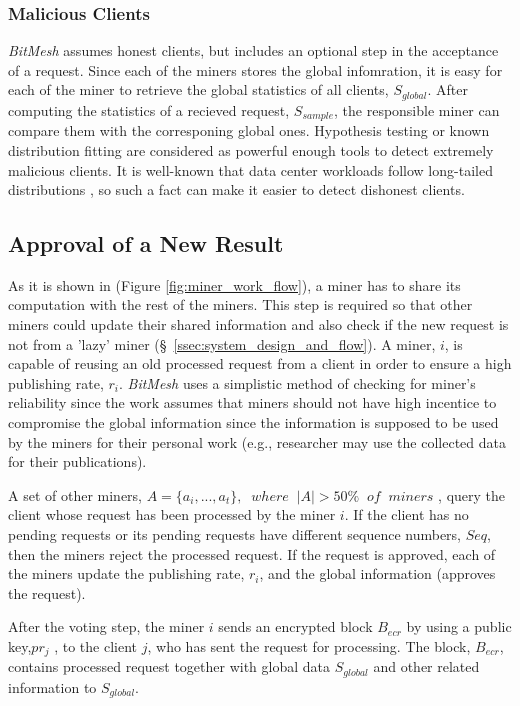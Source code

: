 \documentclass[11px]{article}
\newcommand{\projTitle}{BitMesh\xspace}
\begin{document}
\subsubsection{Malicious Clients} \label{sssec:malicious_client}
\textit{\projTitle} assumes honest clients, but includes an optional step in the acceptance of a request. Since each of the miners stores the global infomration, it is easy for each of the miner to retrieve the global statistics of all clients, $S_{global}$. After computing the statistics of a recieved request, $S_{sample}$, the responsible miner can compare them with the corresponing global ones. Hypothesis testing or known distribution fitting \cite{walpole_statistics} are considered as powerful enough tools to detect extremely malicious clients. It is well-known that data center workloads follow long-tailed distributions \cite{diurnal_pattern_data_center_2, dctcp_ref, pFabric_ref}, so such a fact can make it easier to detect dishonest clients.

\subsection{Approval of a New Result}
As it is shown in (Figure \ref{fig:miner_work_flow}), a miner has to share its computation with the rest of the miners.  This step is required so that other miners could update their shared information and also check if the new request is not from a 'lazy' miner (\S\ \ref{ssec:system_design_and_flow}). A miner, $i$, is capable of  reusing an old processed request from a client in order to ensure a high publishing rate, $r_i$. \textit{\projTitle} uses a simplistic method of checking for miner's reliability since the work assumes that miners should not have high incentice to compromise the global information since the information is supposed to be used by the miners for their personal work (e.g., researcher may use the collected data for their publications).

\noindent \newline A set of other miners, $A= \{a_i, ..., a_t\}, \; \; where \; \; |A| > 50\% \; \; of \; \; miners$ , query the client whose request has been processed by the miner $i$. If the client has no pending requests or its pending requests have different sequence numbers, $Seq$, then the miners reject the processed request. If the request is approved, each of the miners update the publishing rate, $r_i$, and the global information (approves the request).

\noindent \newline After the voting step, the miner $i$ sends an encrypted block $B_{ecr}$ by using a public key,$pr_j$ , to the client $j$, who has sent the request for processing. The block, $B_{ecr}$, contains processed request together with global data $S_{global}$  and other related information to $S_{global}$.
\end{document}
